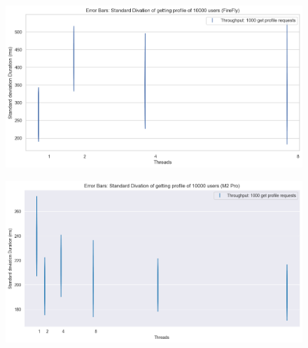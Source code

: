 \documentclass[a4paper]{article}
\begin{document}
\begin{figure}[H]
	\centering
	\includegraphics[width = \linewidth]{Images/ThroughputStdFirefly.png}
	\caption{}
\end{figure}

\begin{figure}[H]
	\centering
	\includegraphics[width = \linewidth]{Images/ThroughputStd.png}
	\caption{}
\end{figure}
\end{document}
